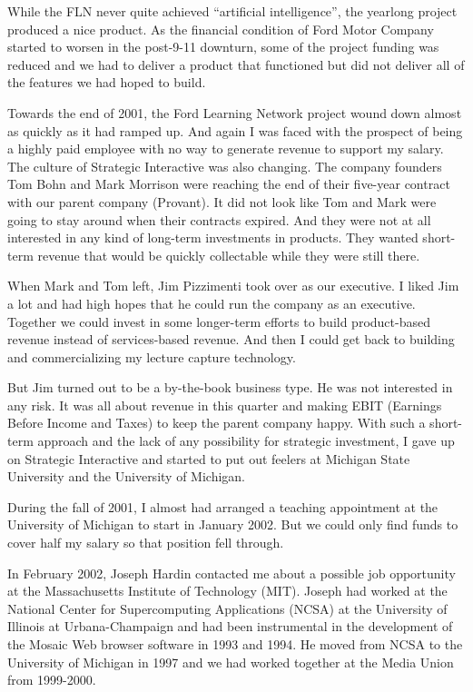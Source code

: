 \documentclass[12pt]{book}
\begin{document}
While the FLN never quite achieved ``artificial intelligence'', the
yearlong project produced a nice product.  As the financial
condition of Ford Motor Company started to worsen in the post-9-11
downturn, some of the project
funding was reduced and we had to deliver a product that functioned but
did not deliver all of the features we had hoped to build.

Towards the end of 2001, the Ford Learning Network project
wound down almost as quickly as it had ramped up.
And again I was faced with the prospect of being a highly paid employee
with no way to generate revenue to support my salary.
The culture of Strategic Interactive
was also changing.  The company founders Tom Bohn and Mark Morrison
were reaching the end of their five-year contract with
our parent company (Provant).
It did not look like Tom and Mark were going to stay around when their
contracts expired.  And they were not at all interested in any kind
of long-term investments in products.  They wanted short-term revenue
that would be quickly collectable while they were still there.

When Mark and Tom left, Jim Pizzimenti took over as
our executive.  I liked Jim a lot and had high hopes that he could
run the company as an executive.  Together we could invest in
some longer-term efforts to build product-based revenue instead
of services-based revenue.  And then I could get back to building and
commercializing my lecture capture technology.

But Jim turned out to be a by-the-book business type.  He was not
interested in any risk.  It was all about revenue in this quarter
and making EBIT (Earnings Before Income and Taxes) to keep the parent
company happy.
With such a short-term approach and the lack of any
possibility for strategic investment,
I gave up on Strategic Interactive and started to put out
feelers at Michigan State University and the University of Michigan.

During the fall of 2001, I almost had arranged a teaching appointment
at the University of Michigan to start in January 2002.
But we could only find funds to cover half my salary so that position
fell through.

In February 2002, Joseph Hardin contacted me about a possible job
opportunity at the Massachusetts Institute of Technology (MIT).
Joseph had worked at the National Center for Supercomputing Applications
(NCSA) at the University of Illinois at Urbana-Champaign
and had been instrumental in the development of the Mosaic Web browser
software in 1993 and 1994.  He moved from NCSA to the University of
Michigan in 1997 and we had worked together at the Media Union
from 1999-2000.
\end{document}
